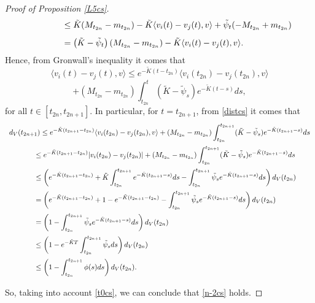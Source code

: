 \documentclass[a4paper,11pt,oneside]{article}
\begin{document}
\begin{proof}[Proof of Proposition \ref{L5cs}]
$$\begin{array}{l}
		\vspace{0.3 cm}\displaystyle{\hspace{1.5 cm}\leq \tilde K(M_{t_{2n}}-m_{t_{2n}})-\tilde K\langle v_{i}(t)-v_{j}(t),v\rangle+\tilde\psi_{t}(-M_{t_{2n}}+m_{t_{2n}})
		}\\
		\displaystyle{\hspace{1.5 cm}=\left(\tilde K-\tilde\psi_{t}\right)(M_{t_{2n}}-m_{t_{2n}})-\tilde K\langle v_{i}(t)-v_{j}(t),v\rangle.}
	\end{array}$$
	Hence, from Gronwall's inequality it comes that $$\langle v_{i}(t)-v_{j}(t),v\rangle \leq e^{-\tilde K(t-t_{2n})}\langle v_{i}(t_{2n})-v_{j}(t_{2n}),v\rangle$$$$+(M_{t_{2n}}-m_{t_{2n}})\int_{t_{2n}}^{t}\left(\tilde K-\tilde\psi_{s}\right)e^{-\tilde K(t-s)}ds,$$
	for all $t\in [t_{2n},t_{2n+1}]$. In particular, for $t= t_{2n+1}$, from \eqref{distcs} it comes that 
	$$\begin{array}{l}
		\vspace{0.2cm}\displaystyle{d_V(t_{2n+1})\leq e^{-\tilde K(t_{2n+1}-t_{2n})}\langle v_{i}(t_{2n})-v_{j}(t_{2n}),v\rangle+(M_{t_{2n}}-m_{t_{2n}})\int_{t_{2n}}^{t_{2n+1}}(\tilde K-\tilde \psi_{s})e^{-\tilde K(t_{2n+1}-s)}ds}\\
		\vspace{0.2cm}\displaystyle{\hspace{1.3cm}\leq e^{-\tilde K(t_{2n+1}-t_{2n})}\lvert v_{i}(t_{2n})-v_{j}(t_{2n})\rvert +(M_{t_{2n}}-m_{t_{2n}})\int_{t_{2n}}^{t_{2n+1}}(\tilde K-\tilde \psi_{s})e^{-\tilde K(t_{2n+1}-s)}ds}\\
		\vspace{0.2cm}\displaystyle{\hspace{1.3cm}\leq \left(e^{-\tilde K(t_{2n+1}-t_{2n})} +\tilde K\int_{t_{2n}}^{t_{2n+1}}e^{-\tilde K(t_{2n+1}-s)}ds-\int_{t_{2n}}^{t_{2n+1}}\tilde\psi_{s}e^{-\tilde K(t_{2n+1}-s)}ds\right)d_V(t_{2n})}\\
		\vspace{0.2cm}\displaystyle{\hspace{1.3cm}= \left(e^{-\tilde K(t_{2n+1}-t_{2n})} +1-e^{-\tilde K(t_{2n+1}-t_{2n})}-\int_{t_{2n}}^{t_{2n+1}}\tilde\psi_{s}e^{-\tilde K(t_{2n+1}-s)}ds\right)d_V(t_{2n})}\\
		\vspace{0.2cm}\displaystyle{\hspace{1.3cm}=\left(1-\int_{t_{2n}}^{t_{2n+1}}\tilde \psi_{s}e^{-\tilde K(t_{2n+1}-s)}ds\right)d_V(t_{2n})}\\
		\vspace{0.2cm}\displaystyle{\hspace{1.3cm}\leq \left(1-e^{-\tilde KT}\int_{t_{2n}}^{t_{2n+1}}\tilde \psi_{s}ds\right)d_V(t_{2n})}\\
		\vspace{0.2cm}\displaystyle{\hspace{1.3cm}\leq\left(1-\int_{t_{2n}}^{t_{2n+1}}\phi(s)ds\right)d_V(t_{2n}).}
	\end{array}$$
	So, taking into account \eqref{t0cs}, we can conclude that \eqref{n-2cs} holds.
\end{proof}
\end{document}
